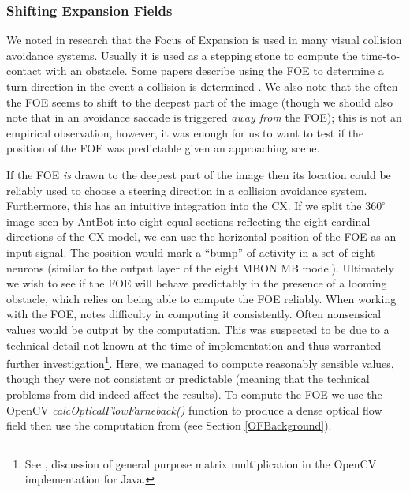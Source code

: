 \documentclass[a4paper,11pt,twoside,openright]{article}
\begin{document}
\subsubsection{ Shifting Expansion Fields }
We noted in research that the Focus of Expansion is used in many visual collision
avoidance systems. Usually it is used as a stepping stone to compute the
time-to-contact with an obstacle. Some papers describe using the FOE to determine
a turn direction in the event a collision is determined \cite{Stewart2010,
  Vanderstap2012}. We also note that the often the FOE seems to shift to the
deepest part of the image \cite{Vanderstap2012, Souhila2007} (though we should
also note that in \cite{Stewart2010} an avoidance saccade is triggered
\textit{away from} the FOE); this is not an empirical observation,
however, it was enough for us to want to test if the position of the
FOE was predictable given an approaching scene.
\newline
\par

If the FOE \textit{is} drawn to the deepest part of the image then its
location could be reliably used to choose a steering direction in a
collision avoidance system. Furthermore, this has an intuitive
integration into the CX. If we split the $360^{\circ}$ image seen by
AntBot into eight equal sections reflecting the eight cardinal
directions of the CX model, we can use the horizontal position of the
FOE as an input signal. The position would mark a ``bump'' of activity
in a set of eight neurons (similar to the output layer of the eight
MBON MB model). Ultimately we wish to see if the FOE will behave
predictably in the presence of a looming obstacle, which relies on
being able to compute the FOE reliably.  When working with the FOE,
\cite{Mitchell2018} notes difficulty in computing it
consistently. Often nonsensical values would be output by the
computation. This was suspected to be due to a technical detail not
known at the time of implementation and thus warranted further
investigation\footnote{See \cite{Mitchell2018}, discussion of general
  purpose matrix multiplication in the OpenCV implementation for
  Java.}. Here, we managed to compute reasonably sensible values,
though they were not consistent or predictable (meaning that the
technical problems from \cite{Mitchell2018} did indeed affect the
results). To compute the FOE we use the OpenCV
\textit{calcOpticalFlowFarneback()} function to produce a dense
optical flow field then use the computation from \cite{ODonovan2005}
(see Section \ref{OFBackground}).
\newline
\par
\end{document}

